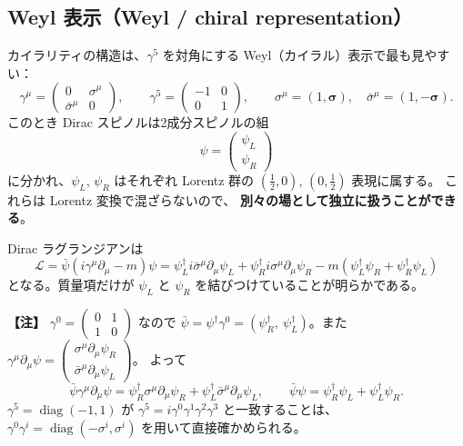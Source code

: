 \documentclass[uplatex,dvipdfmx,a4paper,11pt,openany]{jsbook}
\newenvironment{note}{\vspace{1ex}\par\footnotesize\noindent\textbf{【注】}}{\par\vspace{1ex}}
\numberwithin{equation}{chapter}
\theoremstyle{definition}
\theoremstyle{plain}
\theoremstyle{remark}
\newcommand{\Lag}{\mathcal{L}}
\newcommand{\diag}{\operatorname{diag}}
\begin{document}
\subsection{Weyl 表示（Weyl / chiral representation）}
カイラリティの構造は、$\gamma^5$ を対角にする Weyl（カイラル）表示で最も見やすい：
\begin{equation}
\gamma^\mu=\begin{pmatrix}0&\sigma^\mu\\ \bar\sigma^\mu&0\end{pmatrix},
\qquad
\gamma^5=\begin{pmatrix}-1&0\\0&1\end{pmatrix},
\qquad
\sigma^\mu=(1,\bm\sigma),\quad
\bar\sigma^\mu=(1,-\bm\sigma).
\end{equation}
このとき Dirac スピノルは2成分スピノルの組
\begin{equation}
\psi=\begin{pmatrix}\psi_L\\ \psi_R\end{pmatrix}
\end{equation}
に分かれ、$\psi_L$, $\psi_R$ はそれぞれ Lorentz 群の
$(\frac12,0)$, $(0,\frac12)$ 表現に属する。
これらは Lorentz 変換で混ざらないので、
\textbf{別々の場として独立に扱うことができる}。

Dirac ラグランジアンは
\begin{equation}
\Lag
=\bar\psi(i\gamma^\mu\partial_\mu-m)\psi
=
\psi_L^\dagger i\bar\sigma^\mu\partial_\mu\psi_L
+\psi_R^\dagger i\sigma^\mu\partial_\mu\psi_R
-m\left(\psi_L^\dagger\psi_R+\psi_R^\dagger\psi_L\right)
\end{equation}
となる。質量項だけが $\psi_L$ と $\psi_R$ を結びつけていることが明らかである。
\begin{note}
$\gamma^0=\begin{pmatrix}0&1\\1&0\end{pmatrix}$ なので
$\bar\psi=\psi^\dagger\gamma^0=(\psi_R^\dagger,\ \psi_L^\dagger)$。また
$\gamma^\mu\partial_\mu\psi=\begin{pmatrix}\sigma^\mu\partial_\mu\psi_R\\ \bar\sigma^\mu\partial_\mu\psi_L\end{pmatrix}$。
よって
\[
\bar\psi\gamma^\mu\partial_\mu\psi
=\psi_R^\dagger\sigma^\mu\partial_\mu\psi_R+\psi_L^\dagger\bar\sigma^\mu\partial_\mu\psi_L,
\qquad
\bar\psi\psi=\psi_R^\dagger\psi_L+\psi_L^\dagger\psi_R .
\]
$\gamma^5=\diag(-1,1)$ が $\gamma^5=i\gamma^0\gamma^1\gamma^2\gamma^3$ と一致することは、
$\gamma^0\gamma^i=\diag(-\sigma^i,\sigma^i)$ を用いて直接確かめられる。
\end{note}
\end{document}
